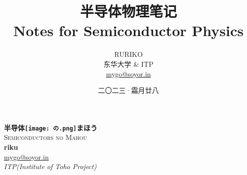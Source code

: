 \documentclass{report}
\title{\Huge\textbf{半导体物理笔记}\\ \vspace{1ex}\LARGE Notes for Semiconductor Physics}
\author{\Large RURIKO\vspace{2ex} \\ \vspace{2ex}东华大学 \& ITP \\ \href{mailto:mygo@soyor.in}{mygo@soyor.in}}
\date{二〇二三·霜月廿八}
\numberwithin{equation}{section}
\begin{document}
\begin{titlepage}
\begin{center}
  {\Huge\bfseries 半导体\texttt{[image: の.png]}まほう}\\[2ex]
  \textsc{\LARGE Semiconductors no Mahou}\\[6.5ex]
  {\large\bfseries riku}           \\
  \vspace{4ex}
  \href{mailto:mygo@soyor.in}{mygo@soyor.in}                    \\[5pt]
  \textit{ITP(Institute of Toho Project)}                \\[0.8cm]
  \begin{figure}[H]
      \centering
\iffalse
{} %

\begin{tikzpicture}[x=0.75pt,y=0.75pt,yscale=-1,xscale=1]


\end{tikzpicture}
\end{figure}
\end{center}
\end{titlepage}
\end{document}
